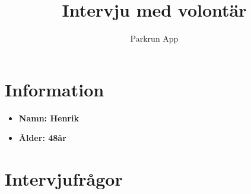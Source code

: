 \documentclass{article}
\title{\textbf{Intervju med volontär}}
\author{Parkrun App}
\date{}
\begin{document}
\maketitle
\thispagestyle{empty}
\section*{Information}
\begin{itemize}[label=]
    \item \textbf{Namn: Henrik} 
    \item \textbf{Ålder: 48år} 
\end{itemize}

\section*{Intervjufrågor}
\end{document}
